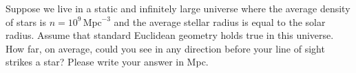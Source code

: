 Suppose we live in a static and infinitely large universe where the average
density of stars is $n = 10^{9}\,\mathrm{Mpc}^{-3}$ and the average stellar
radius is equal to the solar radius. Assume that standard Euclidean geometry
holds true in this universe. How far, on average, could you see in any
direction before your line of sight strikes a star? Please write your answer
in Mpc.
